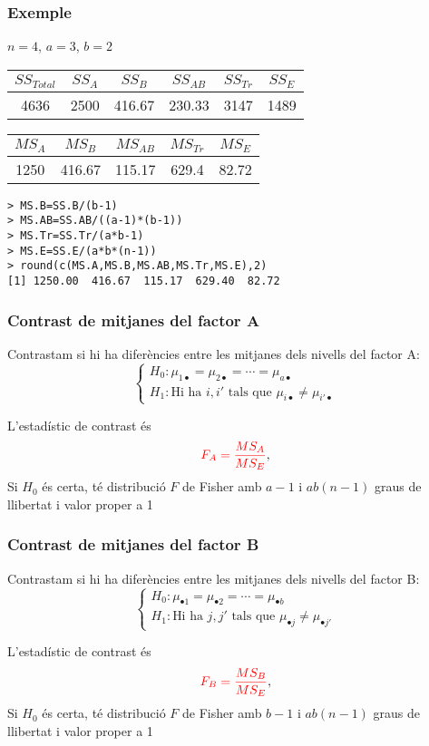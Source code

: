 \documentclass[12pt,t]{beamer}
\newcommand{\red}[1]{\textcolor{red}{#1}}
\theoremstyle{plain}
\theoremstyle{definition}
\begin{document}
\begin{frame}[fragile]
\frametitle{Exemple}

$n=4$, $a=3$, $b=2$
\medskip

\begin{center}
\begin{tabular}{cccccc}
$SS_{Total}$ & $SS_A$ & $SS_B$ &   $SS_{AB}$ &$SS_{Tr}$ &  $SS_E$\\ \hline
4636 & 2500  & 416.67  &   230.33  & 3147  &  1489
\end{tabular}
\bigskip

\begin{tabular}{ccccc}
$MS_A$ & $MS_B$ & $MS_{AB}$ & $MS_{Tr}$ & $MS_E$\\ \hline
1250 &  416.67 &  115.17 & 629.4 &   82.72
\end{tabular}
\end{center}
\begin{lstlisting}
> MS.B=SS.B/(b-1)
> MS.AB=SS.AB/((a-1)*(b-1))
> MS.Tr=SS.Tr/(a*b-1)
> MS.E=SS.E/(a*b*(n-1))
> round(c(MS.A,MS.B,MS.AB,MS.Tr,MS.E),2)
[1] 1250.00  416.67  115.17  629.40  82.72
\end{lstlisting}

\end{frame}



\begin{frame}
\frametitle{Contrast de mitjanes del factor A}

 Contrastam si  hi ha diferències entre les mitjanes dels nivells del factor A:
$$
\left\{
\begin{array}{l}
H_0 : \mu_{1\bullet}=\mu_{2\bullet}=\cdots
=\mu_{a\bullet} \\
H_1 :  \mbox{Hi ha } i,i'\mbox{ tals que }  \mu_{i\bullet}
\not = \mu_{i'\bullet}
\end{array}
\right.
$$
\medskip

L'estadístic de contrast és
$$
\red{F_A=\frac{MS_A}{MS_E}},
$$
Si $H_0$ és certa, té
distribució $F$ de Fisher amb $a-1$ i $ab(n-1)$ graus de llibertat i valor proper a 1

\end{frame}


\begin{frame}
\frametitle{Contrast de mitjanes del factor B}
 Contrastam si  hi ha diferències entre les mitjanes dels nivells del factor  B:
$$
\left\{
\begin{array}{l}
H_0 : \mu_{\bullet 1}=\mu_{\bullet 2}=\cdots =\mu_{ \bullet
b} \\
H_1 :  \mbox{Hi ha } j,j'\mbox{ tals que }  \mu_{\bullet j}
\not = \mu_{\bullet j'}
\end{array}
\right.
$$
\medskip

L'estadístic de contrast és
$$
\red{F_B=\frac{MS_B}{MS_E}},
$$
Si $H_0$ és certa, té
distribució $F$ de Fisher amb $b-1$ i $ab(n-1)$ graus de llibertat i valor proper a 1

\end{frame}
\end{document}
